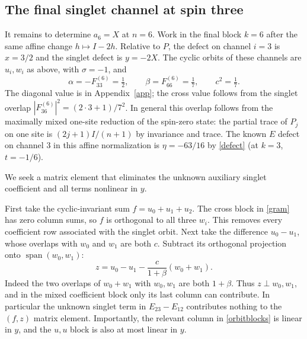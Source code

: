 \documentclass[11pt]{article}
\begin{document}
\subsection{The final singlet channel at spin three}
It remains to determine $a_6=X$ at $n=6$. Work in the final block $k=6$ after the same affine change $h\mapsto I-2h$. Relative to $P$, the defect on channel $i=3$ is $x=3/2$ and the singlet defect is $y=-2X$. The cyclic orbits of these channels are $u_i,w_i$ as above, with $\sigma=-1$, and
\[
 \alpha=-F^{(6)}_{33}=\tfrac12,\qquad \beta=F^{(6)}_{66}=\tfrac17,\qquad c^2=\tfrac17.
\]
The diagonal value is in Appendix~\ref{app}; the cross value follows from the singlet overlap $|F^{(6)}_{36}|^2=(2\cdot3+1)/7^2$. In general this overlap follows from the maximally mixed one-site reduction of the spin-zero state: the partial trace of $P_j$ on one site is $(2j+1)I/(n+1)$ by invariance and trace. The known $E$ defect on channel 3 in this affine normalization is $\eta=-63/16$ by \eqref{defect} (at $k=3$, $t=-1/6$).

We seek a matrix element that eliminates the unknown auxiliary singlet coefficient and all terms nonlinear in $y$.

First take the cyclic-invariant sum $f=u_0+u_1+u_2$. The cross block in \eqref{gram} has zero column sums, so $f$ is orthogonal to all three $w_i$. This removes every coefficient row associated with the singlet orbit. Next take the difference $u_0-u_1$, whose overlaps with $w_0$ and $w_1$ are both $c$. Subtract its orthogonal projection onto $\operatorname{span}(w_0,w_1)$:
\[
 z=u_0-u_1-\frac{c}{1+\beta}(w_0+w_1).
\]
Indeed the two overlaps of $w_0+w_1$ with $w_0,w_1$ are both $1+\beta$. Thus $z\perp w_0,w_1$, and in the mixed coefficient block only its last column can contribute. In particular the unknown singlet term in $E_{23}-E_{12}$ contributes nothing to the $(f,z)$ matrix element. Importantly, the relevant column in \eqref{orbitblocks} is linear in $y$, and the $u,u$ block is also at most linear in $y$.
\end{document}
